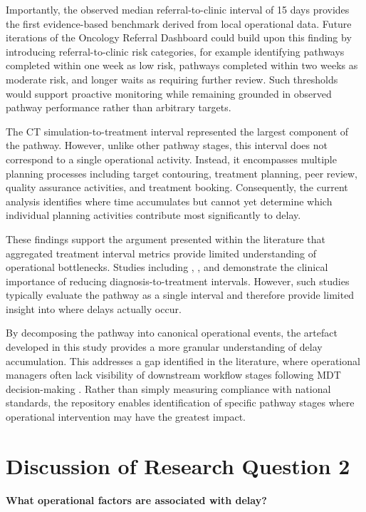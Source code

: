 Importantly, the observed median referral-to-clinic interval of 15 days provides the first evidence-based benchmark derived from local operational data. Future iterations of the Oncology Referral Dashboard could build upon this finding by introducing referral-to-clinic risk categories, for example identifying pathways completed within one week as low risk, pathways completed within two weeks as moderate risk, and longer waits as requiring further review. Such thresholds would support proactive monitoring while remaining grounded in observed pathway performance rather than arbitrary targets.

The CT simulation-to-treatment interval represented the largest component of the pathway. However, unlike other pathway stages, this interval does not correspond to a single operational activity. Instead, it encompasses multiple planning processes including target contouring, treatment planning, peer review, quality assurance activities, and treatment booking. Consequently, the current analysis identifies where time accumulates but cannot yet determine which individual planning activities contribute most significantly to delay. 

These findings support the argument presented within the literature that aggregated treatment interval metrics provide limited understanding of operational bottlenecks. Studies including \cite{hanna2020}, \cite{sharma2016}, and \cite{villemure-poliquin2025} demonstrate the clinical importance of reducing diagnosis-to-treatment intervals. However, such studies typically evaluate the pathway as a single interval and therefore provide limited insight into where delays actually occur. 

By decomposing the pathway into canonical operational events, the artefact developed in this study provides a more granular understanding of delay accumulation. This addresses a gap identified in the literature, where operational managers often lack visibility of downstream workflow stages following MDT decision-making \citep{soukup2022, law2024}. Rather than simply measuring compliance with national standards, the repository enables identification of specific pathway stages where operational intervention may have the greatest impact.  

\section{Discussion of Research Question 2}
\textbf{What operational factors are associated with delay?}

